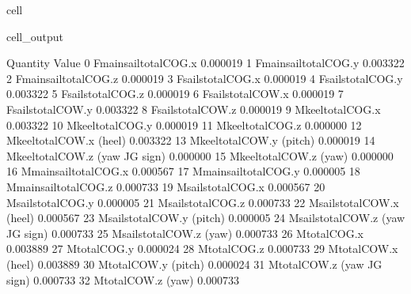 \documentclass[letterpaper,10pt,english]{jupyterBook}
\begin{document}
\begin{sphinxuseclass}{cell}
\begin{sphinxVerbatimOutput}
\begin{sphinxuseclass}{cell_output}
\begin{sphinxVerbatim}[commandchars=\\\{\}]
                               Quantity     Value
0               F\PYGZus{}main\PYGZus{}sail\PYGZus{}total\PYGZus{}COG.x  0.000019
1               F\PYGZus{}main\PYGZus{}sail\PYGZus{}total\PYGZus{}COG.y  0.003322
2               F\PYGZus{}main\PYGZus{}sail\PYGZus{}total\PYGZus{}COG.z \PYGZhy{}0.000019
3                   F\PYGZus{}sails\PYGZus{}total\PYGZus{}COG.x  0.000019
4                   F\PYGZus{}sails\PYGZus{}total\PYGZus{}COG.y  0.003322
5                   F\PYGZus{}sails\PYGZus{}total\PYGZus{}COG.z \PYGZhy{}0.000019
6                   F\PYGZus{}sails\PYGZus{}total\PYGZus{}COW.x  0.000019
7                   F\PYGZus{}sails\PYGZus{}total\PYGZus{}COW.y  0.003322
8                   F\PYGZus{}sails\PYGZus{}total\PYGZus{}COW.z \PYGZhy{}0.000019
9                    M\PYGZus{}keel\PYGZus{}total\PYGZus{}COG.x \PYGZhy{}0.003322
10                   M\PYGZus{}keel\PYGZus{}total\PYGZus{}COG.y  0.000019
11                   M\PYGZus{}keel\PYGZus{}total\PYGZus{}COG.z  0.000000
12            M\PYGZus{}keel\PYGZus{}total\PYGZus{}COW.x (heel) \PYGZhy{}0.003322
13           M\PYGZus{}keel\PYGZus{}total\PYGZus{}COW.y (pitch)  0.000019
14   M\PYGZus{}keel\PYGZus{}total\PYGZus{}COW.z (yaw \PYGZhy{} JG sign) \PYGZhy{}0.000000
15             M\PYGZus{}keel\PYGZus{}total\PYGZus{}COW.z (yaw)  0.000000
16              M\PYGZus{}main\PYGZus{}sail\PYGZus{}total\PYGZus{}COG.x \PYGZhy{}0.000567
17              M\PYGZus{}main\PYGZus{}sail\PYGZus{}total\PYGZus{}COG.y  0.000005
18              M\PYGZus{}main\PYGZus{}sail\PYGZus{}total\PYGZus{}COG.z  0.000733
19                  M\PYGZus{}sails\PYGZus{}total\PYGZus{}COG.x \PYGZhy{}0.000567
20                  M\PYGZus{}sails\PYGZus{}total\PYGZus{}COG.y  0.000005
21                  M\PYGZus{}sails\PYGZus{}total\PYGZus{}COG.z  0.000733
22           M\PYGZus{}sails\PYGZus{}total\PYGZus{}COW.x (heel) \PYGZhy{}0.000567
23          M\PYGZus{}sails\PYGZus{}total\PYGZus{}COW.y (pitch)  0.000005
24  M\PYGZus{}sails\PYGZus{}total\PYGZus{}COW.z (yaw \PYGZhy{} JG sign) \PYGZhy{}0.000733
25            M\PYGZus{}sails\PYGZus{}total\PYGZus{}COW.z (yaw)  0.000733
26                        M\PYGZus{}total\PYGZus{}COG.x \PYGZhy{}0.003889
27                        M\PYGZus{}total\PYGZus{}COG.y  0.000024
28                        M\PYGZus{}total\PYGZus{}COG.z  0.000733
29                 M\PYGZus{}total\PYGZus{}COW.x (heel) \PYGZhy{}0.003889
30                M\PYGZus{}total\PYGZus{}COW.y (pitch)  0.000024
31        M\PYGZus{}total\PYGZus{}COW.z (yaw \PYGZhy{} JG sign) \PYGZhy{}0.000733
32                  M\PYGZus{}total\PYGZus{}COW.z (yaw)  0.000733
\end{sphinxVerbatim}

\end{sphinxuseclass}\end{sphinxVerbatimOutput}

\end{sphinxuseclass}
\end{document}
